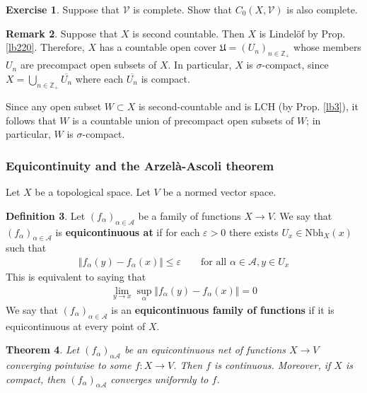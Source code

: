 \documentclass[12pt,b5paper,notitlepage]{article}
\theoremstyle{definition}
\newtheorem{df}{Definition}[subsection]
\newtheorem{exe}[df]{Exercise}
\newtheorem{rem}[df]{Remark}
\theoremstyle{plain}
\newtheorem{thm}[df]{Theorem}
\newcommand{\fk}{\mathfrak}
\newcommand{\ovl}{\overline}
\newcommand{\scr}{\mathscr}
\newcommand{\Zbb}{\mathbb Z}
\newcommand{\Nbh}{\mathrm{Nbh}}
\newcommand{\eps}{\varepsilon}
\newcommand{\MV}{\mathcal V}
\newcommand{\hqed}{\hfill\qedsymbol}
\numberwithin{equation}{section}
\begin{document}
\begin{exe}
Suppose that $\MV$ is complete. Show that $C_0(X,\MV)$ is also complete. 
\end{exe}


\begin{rem}\label{lb84}
Suppose that $X$ is second countable. Then $X$ is Lindel\"of by Prop. \ref{lb220}. Therefore, $X$ has a countable open cover $\fk U=(U_n)_{n\in\Zbb_+}$ whose members $U_n$ are precompact open subsets of $X$. In particular, $X$ is $\sigma$-compact, since $X=\bigcup_{n\in\Zbb_+}\ovl{U_n}$ where each $\ovl{U_n}$ is compact. 

Since any open subset $W\subset X$ is second-countable and is LCH (by Prop. \ref{lb3}), it follows that $W$ is a countable union of precompact open subsets of $W$; in particular, $W$ is $\sigma$-compact.  \hqed
\end{rem}




\subsubsection{Equicontinuity and the Arzel\`a-Ascoli theorem}

Let $X$ be a topological space. Let $V$ be a normed vector space.

\begin{df}
Let $(f_\alpha)_{\alpha\in\scr A}$ be a family of functions $X\rightarrow V$. We say that $(f_\alpha)_{\alpha\in\scr A}$ is \textbf{equicontinuous at }  if for each $\eps>0$ there exists $U_x\in\Nbh_X(x)$ such that
\begin{align}\label{eq93}
\Vert f_\alpha(y)-f_\alpha(x)\Vert\leq\eps\qquad\text{for all }\alpha\in\scr A,y\in U_x
\end{align}
This is equivalent to saying that
\begin{align*}
\lim_{y\rightarrow x}\sup_\alpha\Vert f_\alpha(y)-f_\alpha(x)\Vert=0
\end{align*}
We say that $(f_\alpha)_{\alpha\in\scr A}$ is an \textbf{equicontinuous family of functions} if it is equicontinuous at every point of $X$.
\end{df}


\begin{thm}\label{lb179}
Let $(f_\alpha)_{\alpha\scr A}$ be an equicontinuous net of functions $X\rightarrow V$ converging pointwise to some $f:X\rightarrow V$. Then $f$ is continuous. Moreover, if $X$ is compact, then $(f_\alpha)_{\alpha\scr A}$ converges uniformly to $f$.
\end{thm}
\end{document}

